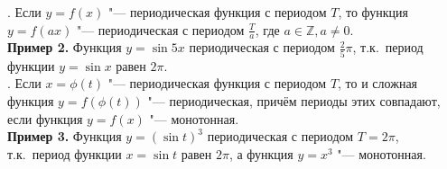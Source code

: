 . Если $y = f(x)$ "--- периодическая функция с периодом $T$,
то функция $y = f(ax)$ "--- периодическая с периодом $\displaystyle\frac{T}{a}$,
где $a \in \mathbb{Z},  a \ne 0$. \\
\indent \textbf{Пример 2.} Функция $y = \sin 5x$ периодическая с периодом
$\displaystyle\frac{2}{5}\pi$, т.к.\ период функции $y = \sin x$ равен $2\pi$. \\

. Если $x = \phi(t)$ "--- периодическая функция с периодом $T$, то и сложная функция
$y = f(\phi(t))$ "--- периодическая, причём периоды этих совпадают, если функция
$y = f(x)$ "--- монотонная. \\

\indent \textbf{Пример 3.} Функция $y = (\sin t)^{3}$ периодическая с периодом $T = 2\pi$,
т.к.\ период функции $x = \sin t$ равен $2\pi$, а функция $y = x^{3}$ "--- монотонная.




